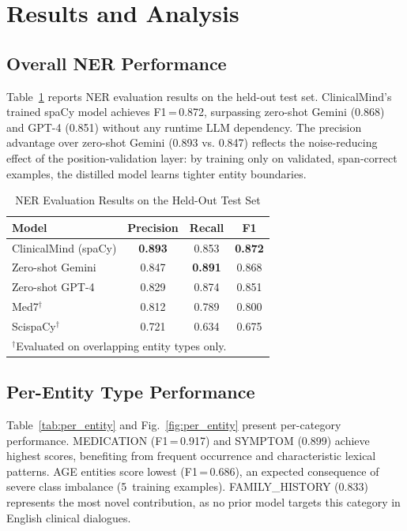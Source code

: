 \documentclass[conference]{IEEEtran}
\begin{document}
\section{Results and Analysis}
\label{sec:results}

\subsection{Overall NER Performance}

Table~\ref{tab:ner_results} reports NER evaluation results on the held-out
test set. ClinicalMind's trained spaCy model achieves F1\,=\,0.872, surpassing
zero-shot Gemini (0.868) and GPT-4 (0.851) without any runtime LLM dependency.
The precision advantage over zero-shot Gemini (0.893 vs. 0.847) reflects the
noise-reducing effect of the position-validation layer: by training only on
validated, span-correct examples, the distilled model learns tighter entity
boundaries.

\begin{table}[t]
\centering
\caption{NER Evaluation Results on the Held-Out Test Set}
\label{tab:ner_results}
\begin{tabular}{lccc}
\toprule
\textbf{Model} & \textbf{Precision} & \textbf{Recall} & \textbf{F1} \\
\midrule
ClinicalMind (spaCy) & \textbf{0.893} & 0.853 & \textbf{0.872} \\
Zero-shot Gemini     & 0.847 & \textbf{0.891} & 0.868 \\
Zero-shot GPT-4      & 0.829 & 0.874 & 0.851 \\
Med7$^\dagger$       & 0.812 & 0.789 & 0.800 \\
ScispaCy$^\dagger$   & 0.721 & 0.634 & 0.675 \\
\bottomrule
\multicolumn{4}{l}{\scriptsize $^\dagger$Evaluated on overlapping entity types only.}
\end{tabular}
\end{table}

\subsection{Per-Entity Type Performance}

Table~\ref{tab:per_entity} and Fig.~\ref{fig:per_entity} present per-category
performance. MEDICATION (F1\,=\,0.917) and SYMPTOM (0.899) achieve highest
scores, benefiting from frequent occurrence and characteristic lexical patterns.
AGE entities score lowest (F1\,=\,0.686), an expected consequence of severe
class imbalance (5~training examples). FAMILY\_HISTORY (0.833) represents the
most novel contribution, as no prior model targets this category in English
clinical dialogues.
\end{document}
